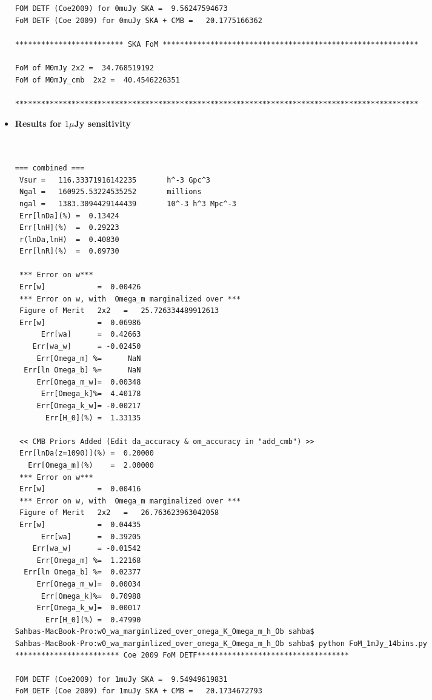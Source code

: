 \documentclass[11pt]{amsart}
\begin{document}
\begin{itemize}
\begin{verbatim}
FOM DETF (Coe2009) for 0muJy SKA =  9.56247594673
FoM DETF (Coe 2009) for 0muJy SKA + CMB =   20.1775166362

************************* SKA FoM ***********************************************************

FoM of M0mJy 2x2 =  34.768519192
FoM of M0mJy_cmb  2x2 =  40.4546226351

*********************************************************************************************
\end{verbatim}



\item \textbf{Results for $1 \mu$Jy sensitivity}


\begin{verbatim}


=== combined ===
 Vsur =   116.33371916142235       h^-3 Gpc^3
 Ngal =   160925.53224535252       millions
 ngal =   1383.3094429144439       10^-3 h^3 Mpc^-3
 Err[lnDa](%) =  0.13424
 Err[lnH](%)  =  0.29223
 r(lnDa,lnH)  =  0.40830
 Err[lnR](%)  =  0.09730

 *** Error on w***
 Err[w]            =  0.00426
 *** Error on w, with  Omega_m marginalized over ***
 Figure of Merit   2x2   =   25.726334489912613
 Err[w]            =  0.06986
      Err[wa]      =  0.42663
    Err[wa_w]      = -0.02450
     Err[Omega_m] %=      NaN
  Err[ln Omega_b] %=      NaN
     Err[Omega_m_w]=  0.00348
      Err[Omega_k]%=  4.40178
     Err[Omega_k_w]= -0.00217
       Err[H_0](%) =  1.33135

 << CMB Priors Added (Edit da_accuracy & om_accuracy in "add_cmb") >>
 Err[lnDa(z=1090)](%) =  0.20000
   Err[Omega_m](%)    =  2.00000
 *** Error on w***
 Err[w]            =  0.00416
 *** Error on w, with  Omega_m marginalized over ***
 Figure of Merit   2x2   =   26.763623963042058
 Err[w]            =  0.04435
      Err[wa]      =  0.39205
    Err[wa_w]      = -0.01542
     Err[Omega_m] %=  1.22168
  Err[ln Omega_b] %=  0.02377
     Err[Omega_m_w]=  0.00034
      Err[Omega_k]%=  0.70988
     Err[Omega_k_w]=  0.00017
       Err[H_0](%) =  0.47990
Sahbas-MacBook-Pro:w0_wa_marginlized_over_omega_K_Omega_m_h_Ob sahba$
Sahbas-MacBook-Pro:w0_wa_marginlized_over_omega_K_Omega_m_h_Ob sahba$ python FoM_1mJy_14bins.py
************************ Coe 2009 FoM DETF***********************************

FOM DETF (Coe2009) for 1muJy SKA =  9.54949619831
FoM DETF (Coe 2009) for 1muJy SKA + CMB =   20.1734672793


\end{verbatim}
\end{itemize}
\end{document}
